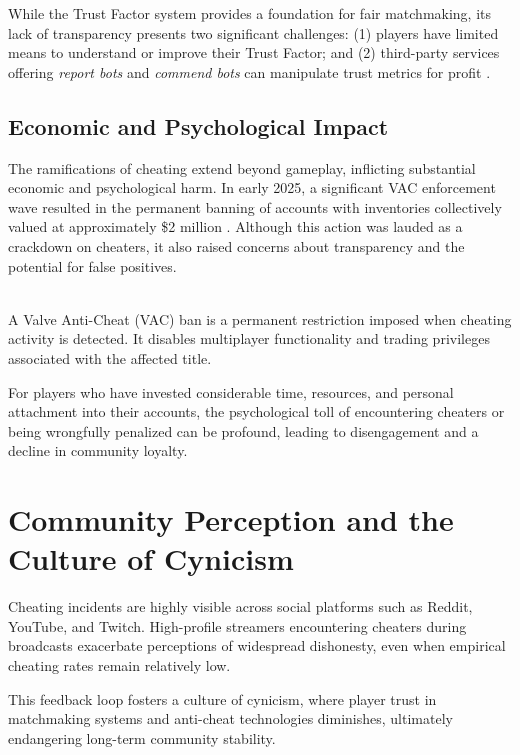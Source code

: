 While the Trust Factor system provides a foundation for fair matchmaking, its lack of transparency presents two significant challenges: (1) players have limited means to understand or improve their Trust Factor; and (2) third-party services offering \textit{report bots} and \textit{commend bots} can manipulate trust metrics for profit \parencite{cs2trustfactor2024}.

\subsection{Economic and Psychological Impact}

The ramifications of cheating extend beyond gameplay, inflicting substantial economic and psychological harm. In early 2025, a significant VAC enforcement wave resulted in the permanent banning of accounts with inventories collectively valued at approximately \$2 million \parencite{escorenews2025vacban}. Although this action was lauded as a crackdown on cheaters, it also raised concerns about transparency and the potential for false positives.

\begin{tcolorbox}[colback=gray!10, colframe=gray!50, boxrule=0pt, sharp corners, width=\linewidth, left=1mm, right=1mm, top=0.5mm, bottom=0.5mm]
 \\
A Valve Anti-Cheat (VAC) ban is a permanent restriction imposed when cheating activity is detected. It disables multiplayer functionality and trading privileges associated with the affected title.
\end{tcolorbox}

For players who have invested considerable time, resources, and personal attachment into their accounts, the psychological toll of encountering cheaters or being wrongfully penalized can be profound, leading to disengagement and a decline in community loyalty.

\section{Community Perception and the Culture of Cynicism}

Cheating incidents are highly visible across social platforms such as Reddit, YouTube, and Twitch. High-profile streamers encountering cheaters during broadcasts exacerbate perceptions of widespread dishonesty, even when empirical cheating rates remain relatively low.

This feedback loop fosters a culture of cynicism, where player trust in matchmaking systems and anti-cheat technologies diminishes, ultimately endangering long-term community stability.

